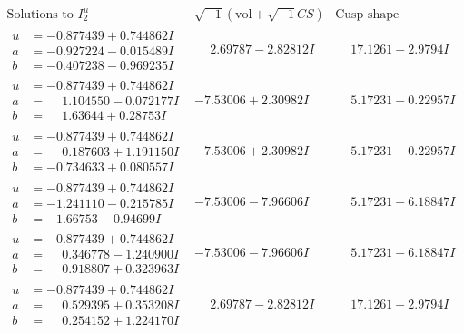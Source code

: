 \documentclass[1p]{elsarticle_modified}
\theoremstyle{definition}
\newcommand{\I}{\sqrt{-1}}
\begin{document}
$$\begin{array}{c|c|c}  
\text{Solutions to }I^u_{2}& \I (\text{vol} + \sqrt{-1}CS) & \text{Cusp shape}\\
 \hline 
\begin{aligned}
u &= -0.877439 + 0.744862 I \\
a &= -0.927224 - 0.015489 I \\
b &= -0.407238 - 0.969235 I\end{aligned}
 & \phantom{-}2.69787 - 2.82812 I & \phantom{-}17.1261 + 2.9794 I \\ \hline\begin{aligned}
u &= -0.877439 + 0.744862 I \\
a &= \phantom{-}1.104550 - 0.072177 I \\
b &= \phantom{-}1.63644 + 0.28753 I\end{aligned}
 & -7.53006 + 2.30982 I & \phantom{-}5.17231 - 0.22957 I \\ \hline\begin{aligned}
u &= -0.877439 + 0.744862 I \\
a &= \phantom{-}0.187603 + 1.191150 I \\
b &= -0.734633 + 0.080557 I\end{aligned}
 & -7.53006 + 2.30982 I & \phantom{-}5.17231 - 0.22957 I \\ \hline\begin{aligned}
u &= -0.877439 + 0.744862 I \\
a &= -1.241110 - 0.215785 I \\
b &= -1.66753 - 0.94699 I\end{aligned}
 & -7.53006 - 7.96606 I & \phantom{-}5.17231 + 6.18847 I \\ \hline\begin{aligned}
u &= -0.877439 + 0.744862 I \\
a &= \phantom{-}0.346778 - 1.240900 I \\
b &= \phantom{-}0.918807 + 0.323963 I\end{aligned}
 & -7.53006 - 7.96606 I & \phantom{-}5.17231 + 6.18847 I \\ \hline\begin{aligned}
u &= -0.877439 + 0.744862 I \\
a &= \phantom{-}0.529395 + 0.353208 I \\
b &= \phantom{-}0.254152 + 1.224170 I\end{aligned}
 & \phantom{-}2.69787 - 2.82812 I & \phantom{-}17.1261 + 2.9794 I \\ \hline\begin{aligned}

\end{aligned}
\end{array}$$
\end{document}
